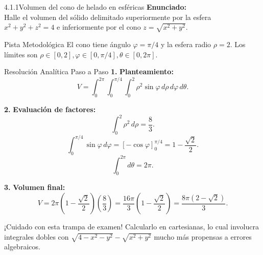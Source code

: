 \documentclass[11pt,a4paper]{article}
\begin{document}
\begin{nivelbox}{4.1.1}{Volumen del cono de helado en esféricas}
\textbf{Enunciado:}\\
Halle el volumen del sólido delimitado superiormente por la esfera $x^2 + y^2 + z^2 = 4$ e inferiormente por el cono $z = \sqrt{x^2 + y^2}$.

\begin{observacionbox}{Pista Metodológica}
El cono tiene ángulo $\varphi = \pi/4$ y la esfera radio $\rho = 2$. Los límites son $\rho \in [0, 2], \varphi \in [0, \pi/4], \theta \in [0, 2\pi]$.
\end{observacionbox}

\begin{ejerciciobox}{Resolución Analítica Paso a Paso}
\smallskip\noindent\textbf{1.} \textbf{Planteamiento:}
\[V = \int_0^{2\pi} \int_0^{\pi/4} \int_0^2 \rho^2 \sin\varphi \, d\rho \, d\varphi \, d\theta.\]

\smallskip\noindent\textbf{2.} \textbf{Evaluación de factores:}
\[\int_0^2 \rho^2 \, d\rho = \frac{8}{3}.\]
\[\int_0^{\pi/4} \sin\varphi \, d\varphi = [-\cos\varphi]_0^{\pi/4} = 1 - \frac{\sqrt{2}}{2}.\]
\[\int_0^{2\pi} d\theta = 2\pi.\]

\smallskip\noindent\textbf{3.} \textbf{Volumen final:}
\[V = 2\pi \left( 1 - \frac{\sqrt{2}}{2} \right) \left( \frac{8}{3} \right) = \frac{16\pi}{3} \left( 1 - \frac{\sqrt{2}}{2} \right) = \frac{8\pi(2 - \sqrt{2})}{3}.\]
\end{ejerciciobox}

\begin{errorbox}{¡Cuidado con esta trampa de examen!}
Calcularlo en cartesianas, lo cual involucra integrales dobles con $\sqrt{4-x^2-y^2} - \sqrt{x^2+y^2}$ mucho más propensas a errores algebraicos.
\end{errorbox}
\end{nivelbox}
\bigskip
\end{document}
